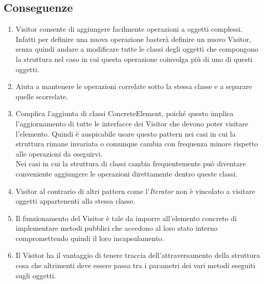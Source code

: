 \subsection{Conseguenze}
\begin{enumerate}
\item Visitor consente di aggiungere facilmente operazioni a oggetti complessi. Infatti per definire una nuova operazione basterà definire un nuovo Visitor, senza quindi andare a modificare tutte le classi degli oggetti che compongono la struttura nel caso in cui questa operazione coinvolga più di uno di questi oggetti.
\item Aiuta a mantenere le operazioni correlate sotto la stessa classe e a separare quelle scorrelate.
\item Complica l'aggiunta di classi ConcreteElement, poiché questo implica l'aggiornamento di tutte le interfacce dei Visitor che devono poter visitare l'elemento. Quindi è auspicabile usare questo pattern nei casi in cui la struttura rimane invariata o comunque cambia con frequenza minore rispetto alle operazioni da eseguirvi.\\
Nei casi in cui la struttura di classi cambia frequentemente può diventare conveniente aggiungere le operazioni direttamente dentro queste classi.
\item Visitor al contrario di altri pattern come l'\textit{Iterator} non è vincolato a visitare oggetti appartenenti alla stessa classe.
\item Il funzionamento del Visitor è tale da imporre all'elemento concreto di implementare metodi pubblici che accedono al loro stato interno compromettendo quindi il loro incapsulamento.
\item Il Visitor ha il vantaggio di tenere traccia dell'attraversamento della struttura cosa che altrimenti deve essere passa tra i parametri dei vari metodi eseguiti sugli oggetti.
\end{enumerate}


 
